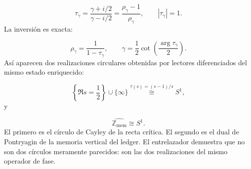 \[
\tau_\gamma
=
\frac{\gamma+i/2}{\gamma-i/2}
=
\frac{\rho_\gamma-1}{\rho_\gamma},
\qquad
|\tau_\gamma|=1.
\]
La inversión es exacta:\par
\[
\rho_\gamma=\frac{1}{1-\tau_\gamma},
\qquad
\gamma
=
\frac12\cot\left(\frac{\arg\tau_\gamma}{2}\right).
\]
Así aparecen dos realizaciones circulares obtenidas por lectores diferenciados del mismo estado enriquecido:\par
\[
\left\{\Re s=\frac12\right\}\cup\{\infty\}
\overset{\tau(s)=(s-1)/s}{\cong}
S^1,
\]
y\par
\[
\widehat{\mathbb Z_{\mathrm{mem}}}
\cong S^1.
\]
El primero es el círculo de Cayley de la recta crítica. El segundo es el dual de Pontryagin de la memoria vertical del ledger. El entrelazador demuestra que no son dos círculos meramente parecidos: son las dos realizaciones del mismo operador de fase.\par
{}
